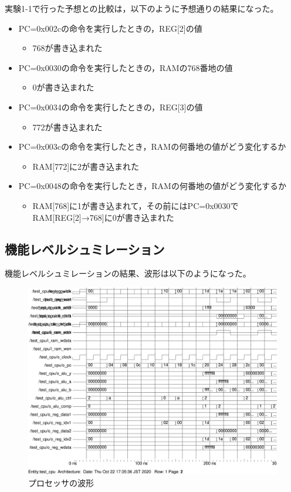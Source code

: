 実験1-1で行った予想との比較は，以下のように予想通りの結果になった。
\begin{itemize}
  \item PC=0x002cの命令を実行したときの，REG[2]の値
  \begin{itemize}
    \item 768が書き込まれた
  \end{itemize}
  \item PC=0x0030の命令を実行したときの，RAMの768番地の値
  \begin{itemize}
    \item 0が書き込まれた
  \end{itemize}
  \item PC=0x0034の命令を実行したときの，REG[3]の値
  \begin{itemize}
    \item 772が書き込まれた
  \end{itemize}
  \item PC=0x003cの命令を実行したとき，RAMの何番地の値がどう変化するか
  \begin{itemize}
    \item RAM[772]に2が書き込まれた
  \end{itemize}
  \item PC=0x0048の命令を実行したとき，RAMの何番地の値がどう変化するか
  \begin{itemize}
    \item RAM[768]に1が書き込まれて，その前にはPC=0x0030でRAM[REG[2]→768]に0が書き込まれた
  \end{itemize}
\end{itemize}

\subsection{機能レベルシュミレーション}
機能レベルシュミレーションの結果、波形は以下のようになった。
\begin{figure}[H]
  \centering
  \includegraphics[width=\linewidth]{./src/01/testCPUwave.png}
  \caption{プロセッサの波形}
  \label{プロセッサの波形1-1}
\end{figure}

